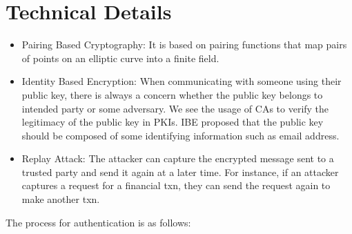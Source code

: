 \documentclass[]{article}   %
\begin{document}
\section*{Technical Details}
\begin{itemize}
    \item Pairing Based Cryptography: It is based on pairing functions that map pairs of points on an elliptic curve into a finite field.
    \item Identity Based Encryption: When communicating with someone using their public key, there is always a concern whether the public key belongs to intended party or some adversary. We see the usage of CAs to verify the legitimacy of the public key in PKIs. IBE proposed that the public key should be composed of some identifying information such as email address.
    \item  Replay Attack: The attacker can capture the encrypted message sent to a trusted party and send it again at a later time. For instance, if an attacker captures a request for a financial txn, they can send the request again to make another txn.
\end{itemize}
The process for authentication is as follows:
\end{document}
